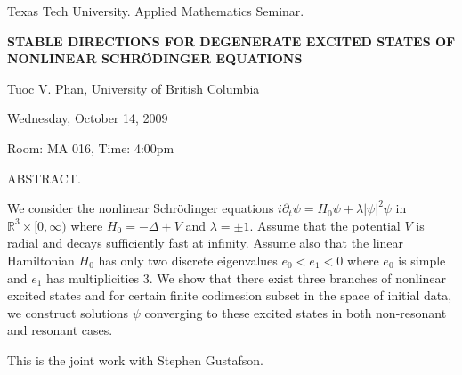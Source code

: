 \documentclass[oneside]{amsart}
\newcommand{\talktitle}{\uppercase{Stable Directions for Degenerate Excited States of Nonlinear Schr\"odinger 
Equations}}
\newcommand{\talkspeaker}{Tuoc V. Phan, University of British Columbia}
\newcommand{\talkdate}{Wednesday, October 14, 2009}
\newcommand{\talkabstract}{
We consider the nonlinear Schr\"{o}dinger equations $i\partial_t \psi = H_0 \psi + \lambda |\psi|^2\psi$ in $\mathbb{R}^3 \times [0,\infty)$ where $H_0 = -\Delta + V$ and $\lambda = \pm 1$. Assume that the potential $V$ is radial and decays sufficiently fast at infinity. Assume also that the linear Hamiltonian $H_0$ has only two discrete eigenvalues $e_0 < e_1 <0$ where $e_0$ is simple and $e_1$ has multiplicities 3. We show that there exist three branches of nonlinear excited states and for certain finite codimesion subset in the space of initial data, we construct solutions $\psi$ converging to these excited states in both non-resonant and resonant cases.

This is the joint work with Stephen Gustafson.
}
\begin{document}
\thispagestyle{empty}

\begin{center}
Texas Tech University.  Applied Mathematics Seminar.

\end{center}

\begin{center}

\textbf{\LARGE \talktitle}

\talkspeaker

\talkdate

Room: MA 016, Time: 4:00pm

\end{center}

ABSTRACT.
\talkabstract
\end{document}
